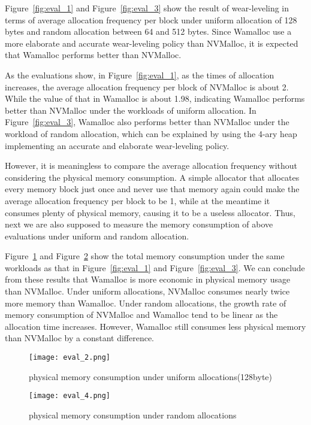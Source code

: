 \documentclass[10pt, conference, compsocconf]{IEEEtran}
\begin{document}
Figure~\ref{fig:eval_1} and Figure~\ref{fig:eval_3} show the result of wear-leveling in terms of average allocation frequency per block
under uniform allocation of 128 bytes and random allocation between 64 and 512 bytes.
Since Wamalloc use a more elaborate and accurate wear-leveling policy than NVMalloc,
it is expected that Wamalloc performs better than NVMalloc.

As the evaluations show, in Figure~\ref{fig:eval_1}, as the times of allocation increases,
the average allocation frequency per block of NVMalloc is about 2.
While the value of that in Wamalloc is about 1.98, 
indicating Wamalloc performs better than NVMalloc under the workloads of uniform allocation.
In Figure~\ref{fig:eval_3},
Wamalloc also performs better than NVMalloc under the workload of random allocation,
which can be explained by using the 4-ary heap implementing an accurate and elaborate wear-leveling policy.

However, it is meaningless to compare the average allocation frequency without considering the physical memory consumption.
A simple allocator that allocates every memory block just once and never use that memory again 
could make the average allocation frequency per block to be 1, 
while at the meantime it consumes plenty of physical memory, causing it to be a useless allocator.
Thus, next we are also supposed to measure the memory consumption of above evaluations under uniform and random allocation.

Figure~\ref{fig:eval_2} and Figure~\ref{fig:eval_4} show the total memory consumption under the same workloads 
as that in Figure~\ref{fig:eval_1} and Figure~\ref{fig:eval_3}.
We can conclude from these results that 
Wamalloc is more economic in physical memory usage than NVMalloc.
Under uniform allocations, NVMalloc consumes nearly twice more memory than Wamalloc.
Under random allocations, the growth rate of memory consumption of NVMalloc and Wamalloc tend to be linear 
as the allocation time increases. 
However, Wamalloc still consumes less physical memory than NVMalloc by a constant difference.

\begin{figure}[t]
\centering
\texttt{[image: eval\_2.png]}
\caption{physical memory consumption under uniform allocations(128byte)}
\label{fig:eval_2}
\end{figure}

\begin{figure}[t]
\centering
\texttt{[image: eval\_4.png]}
\caption{physical memory consumption under random allocations}
\label{fig:eval_4}
\end{figure}
\end{document}
